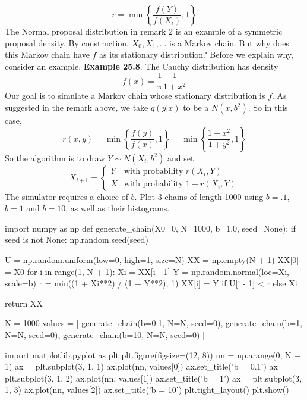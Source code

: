 \[
r = \min \left\{ \frac{f(Y)}{f(X_{i})}, 1\right\}
\]
The Normal proposal distribution in remark 2 is an example of a
symmetric proposal density.
By construction, \(X_{0}, X_{1}, \dots\) is a Markov chain. But why does
this Markov chain have \(f\) as its stationary distribution? Before we
explain why, consider an example.
\textbf{Example 25.8}. The Cauchy distribution has density
\[
f(x) = \frac{1}{\pi} \frac{1}{1 + x^{2}}
\]
Our goal is to simulate a Markov chain whose stationary distribution is
\(f\). As suggested in the remark above, we take \(q(y | x)\) to be a
\(N(x, b^{2})\). So in this case,
\[
r(x, y) = \min \left\{ \frac{f(y)}{f(x)}, 1 \right\} = \min \left\{ \frac{1 + x^{2}}{1 + y^{2}} , 1\right\}
\]
So the algorithm is to draw \(Y \sim N(X_{i}, b^{2})\) and set
\[
X_{i + 1} = \begin{cases}
Y & \text{with probability } r(X_{i}, Y) \\
X & \text{with probability } 1 - r(X_{i}, Y)
\end{cases} 
\]
The simulator requires a choice of \(b\). Plot 3 chains of length
1000 using \(b = .1\), \(b = 1\) and \(b = 10\), as well as their
histograms.

\begin{python}
import numpy as np
def generate_chain(X0=0, N=1000, b=1.0, seed=None):
    if seed is not None:
        np.random.seed(seed)
        
    U = np.random.uniform(low=0, high=1, size=N)
    XX = np.empty(N + 1)
    XX[0] = X0
    for i in range(1, N + 1):
        Xi = XX[i - 1]
        Y = np.random.normal(loc=Xi, scale=b)
        r = min((1 + Xi**2) / (1 + Y**2), 1)
        XX[i] = Y if U[i - 1] < r else Xi
        
    return XX
\end{python}

\begin{python}
N = 1000
values = [
    generate_chain(b=0.1, N=N, seed=0),
    generate_chain(b=1, N=N, seed=0),
    generate_chain(b=10, N=N, seed=0)
]
\end{python}

\begin{python}
import matplotlib.pyplot as plt
plt.figure(figsize=(12, 8))
nn = np.arange(0, N + 1)
ax = plt.subplot(3, 1, 1)
ax.plot(nn, values[0])
ax.set_title('b = 0.1')
ax = plt.subplot(3, 1, 2)
ax.plot(nn, values[1])
ax.set_title('b = 1')
ax = plt.subplot(3, 1, 3)
ax.plot(nn, values[2])
ax.set_title('b = 10')
plt.tight_layout()
plt.show()
\end{python}

